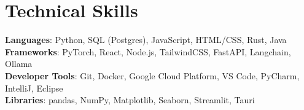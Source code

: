 \documentclass[letterpaper,11pt]{article}
\begin{document}
%
\section{Technical Skills}
 \begin{itemize}[leftmargin=0.15in, label={}]
    \small{\item{
     \textbf{Languages}{: Python, SQL (Postgres), JavaScript, HTML/CSS, Rust, Java} \\
     \textbf{Frameworks}{: PyTorch, React, Node.js, TailwindCSS, FastAPI, Langchain, Ollama} \\
     \textbf{Developer Tools}{: Git, Docker, Google Cloud Platform, VS Code, PyCharm, IntelliJ, Eclipse} \\
     \textbf{Libraries}{: pandas, NumPy, Matplotlib, Seaborn, Streamlit, Tauri} \\
    }}
 \end{itemize}
\end{document}
